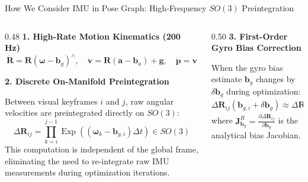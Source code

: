 \documentclass[aspectratio=169, 10pt]{beamer}
\begin{document}
\begin{frame}{How We Consider IMU in Pose Graph: High-Frequency $SO(3)$ Preintegration}
  \begin{columns}[T]
    \begin{column}{0.48\textwidth}
      {\small \textbf{\textcolor{NavyBlue}{1. High-Rate Motion Kinematics (200 Hz)}}}
      \begin{equation}
        \dot{\mathbf{R}} = \mathbf{R} (\boldsymbol{\omega} - \mathbf{b}_g)^\wedge, \quad \dot{\mathbf{v}} = \mathbf{R} (\mathbf{a} - \mathbf{b}_a) + \mathbf{g}, \quad \dot{\mathbf{p}} = \mathbf{v}
      \end{equation}

      \vspace{0.15cm}
      {\small \textbf{\textcolor{NavyBlue}{2. Discrete On-Manifold Preintegration}}}
      \vspace{0.1cm}

      Between visual keyframes $i$ and $j$, raw angular velocities are preintegrated directly on $SO(3)$:
      \begin{equation}
        \Delta \mathbf{R}_{ij} = \prod_{k=i}^{j-1} \operatorname{Exp}\left( (\boldsymbol{\omega}_k - \mathbf{b}_{g, i}) \Delta t \right) \in SO(3)
      \end{equation}
      This computation is independent of the global frame, eliminating the need to re-integrate raw IMU measurements during optimization iterations.
    \end{column}

    \begin{column}{0.50\textwidth}
      {\small \textbf{\textcolor{NavyBlue}{3. First-Order Gyro Bias Correction}}}
      \vspace{0.1cm}

      When the gyro bias estimate $\mathbf{b}_g$ changes by $\delta \mathbf{b}_g$ during optimization:
      \begin{equation}
        \Delta \mathbf{R}_{ij}(\mathbf{b}_{g, i} + \delta \mathbf{b}_g) \approx \Delta \mathbf{R}_{ij}(\mathbf{b}_{g, i}) \operatorname{Exp}\left( \mathbf{J}_{\mathbf{b}_g}^R \delta \mathbf{b}_g \right)
      \end{equation}
      where $\mathbf{J}_{\mathbf{b}_g}^R = \frac{\partial \Delta \mathbf{R}_{ij}}{\partial \mathbf{b}_g}$ is the analytical bias Jacobian.


\end{column}
\end{columns}
\end{frame}
\end{document}
